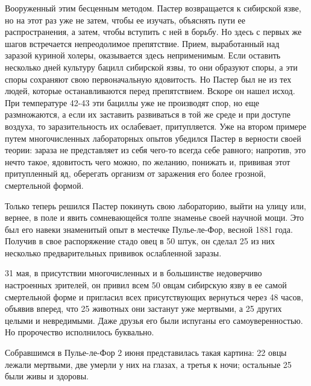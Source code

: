 Вооруженный этим  бесценным  методом. Пастер  возвращается  к  сибирской
язве, но на этот раз уже не  затем, чтобы ее изучать, объяснять пути  ее
распространения, а затем,  чтобы вступить  с ней  в борьбу.  Но здесь  с
первых  же   шагов   встречается   непреодолимое   препятствие.   Прием,
выработанный над заразой куриной холеры, оказывается здесь неприменимым.
Если оставить  несколько дней  культуру бацилл  сибирской язвы,  то  они
образуют споры, а эти споры сохраняют свою первоначальную ядовитость. Но
Пастер был не из тех людей, которые останавливаются перед  препятствием.
Вскоре он  нашел  исход.  При  температуре 42-43  эти  бациллы  уже  не
производят спор, но еще размножаются, а если их заставить развиваться  в
той же среде и  при доступе воздуха,  то заразительность их  ослабевает,
притупляется. Уже на  втором примере  путем многочисленных  лабораторных
опытов убедился Пастер в верности  своей теории: зараза не  представляет
из  себя  чего-то  всегда  себе  равного;  напротив,  это  нечто  такое,
ядовитость  чего   можно,  по   желанию,  понижать   и,  прививая   этот
притупленный яд,  оберегать организм  от  заражения его  более  грозной,
смертельной формой.

Только теперь решился Пастер покинуть  свою лабораторию, выйти на  улицу
или, вернее, в поле и  явить сомневающейся толпе знаменье своей  научной
мощи. Это был его навеки знаменитый опыт в местечке Пулье-ле-Фор, весной
1881 года. Получив в свое распоряжение  стадо овец в 50 штук, он  сделал
25 из них несколько предварительных прививок ослабленной заразы.

31  мая,  в  присутствии  многочисленных  и  в  большинстве  недоверчиво
настроенных зрителей, он привил всем 50 овцам сибирскую язву в ее  самой
смертельной форме  и пригласил  всех присутствующих  вернуться через  48
часов, объявив вперед, что 25 животных  они застанут уже мертвыми, а  25
других  целыми  и  невредимыми.  Даже  друзья  его  были  испуганы   его
самоуверенностью. Но пророчество исполнилось буквально.

Собравшимся в Пулье-ле-Фор 2 июня  представилась такая картина: 22  овцы
лежали мертвыми, две умерли у них на глазах, а третья к ночи;  остальные
25 были живы и здоровы.

